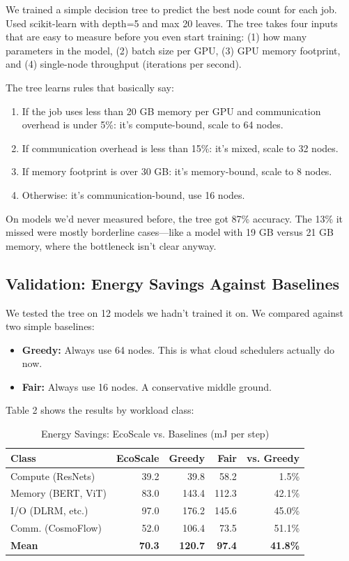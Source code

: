 \documentclass[conference]{IEEEtran}
\begin{document}
We trained a simple decision tree to predict the best node count for each job. Used scikit-learn with depth=5 and max 20 leaves. The tree takes four inputs that are easy to measure before you even start training: (1) how many parameters in the model, (2) batch size per GPU, (3) GPU memory footprint, and (4) single-node throughput (iterations per second).

The tree learns rules that basically say:

\begin{enumerate}
\item If the job uses less than 20 GB memory per GPU and communication overhead is under 5\%: it's compute-bound, scale to 64 nodes.
\item If communication overhead is less than 15\%: it's mixed, scale to 32 nodes.
\item If memory footprint is over 30 GB: it's memory-bound, scale to 8 nodes.
\item Otherwise: it's communication-bound, use 16 nodes.
\end{enumerate}

On models we'd never measured before, the tree got 87\% accuracy. The 13\% it missed were mostly borderline cases---like a model with 19 GB versus 21 GB memory, where the bottleneck isn't clear anyway.

\subsection{Validation: Energy Savings Against Baselines}

We tested the tree on 12 models we hadn't trained it on. We compared against two simple baselines:

\begin{itemize}
\item \textbf{Greedy:} Always use 64 nodes. This is what cloud schedulers actually do now.
\item \textbf{Fair:} Always use 16 nodes. A conservative middle ground.
\end{itemize}

Table 2 shows the results by workload class:

\begin{table}[t]
\centering
\caption{Energy Savings: EcoScale vs. Baselines (mJ per step)}
\label{tab:validation}
\begin{tabular}{|l|rrr|r|}
\hline
\textbf{Class} & \textbf{EcoScale} & \textbf{Greedy} & \textbf{Fair} & \textbf{vs. Greedy} \\
\hline
Compute (ResNets) & 39.2 & 39.8 & 58.2 & 1.5\% \\
Memory (BERT, ViT) & 83.0 & 143.4 & 112.3 & 42.1\% \\
I/O (DLRM, etc.) & 97.0 & 176.2 & 145.6 & 45.0\% \\
Comm. (CosmoFlow) & 52.0 & 106.4 & 73.5 & 51.1\% \\
\hline
\textbf{Mean} & \textbf{70.3} & \textbf{120.7} & \textbf{97.4} & \textbf{41.8\%} \\
\hline
\end{tabular}
\end{table}
\end{document}
